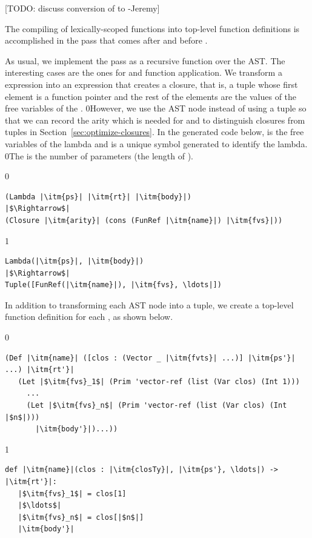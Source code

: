 \documentclass[7x10,nocrop]{TimesAPriori_MIT}%
\def\racketEd{0}
\def\pythonEd{1}
\def\edition{1}
\newcommand{\racket}[1]{{\if\edition\racketEd{#1}\fi}}
\begin{document}
[TODO: discuss conversion of  to  -Jeremy]

The compiling of lexically-scoped functions into top-level function
definitions is accomplished in the pass 
that comes after  and before
. 

As usual, we implement the pass as a recursive function over the
AST. The interesting cases are the ones for  and function
application. We transform a  expression into an expression
that creates a closure, that is, a tuple whose first element is a
function pointer and the rest of the elements are the values of the
free variables of the .
%
\racket{However, we use the 
  AST node instead of using a tuple so that we can record the arity
  which is needed for \code{procedure-arity} and
to distinguish closures from tuples in
Section~\ref{sec:optimize-closures}.}
%
In the generated code below,  is the free variables of the
lambda and  is a unique symbol generated to identify the lambda.
%
\racket{The  is the number of parameters (the length of
  \itm{ps}).}
%
{\if\edition\racketEd
\begin{lstlisting}
(Lambda |\itm{ps}| |\itm{rt}| |\itm{body}|)
|$\Rightarrow$|
(Closure |\itm{arity}| (cons (FunRef |\itm{name}|) |\itm{fvs}|))
\end{lstlisting}
\fi}
%
{\if\edition\pythonEd
\begin{lstlisting}
Lambda(|\itm{ps}|, |\itm{body}|)
|$\Rightarrow$|
Tuple([FunRef(|\itm{name}|), |\itm{fvs}, \ldots|])
\end{lstlisting}
\fi}
%
In addition to transforming each  AST node into a
tuple, we create a top-level function definition for each
, as shown below.\\
\begin{minipage}{0.8\textwidth}
{\if\edition\racketEd
\begin{lstlisting}
(Def |\itm{name}| ([clos : (Vector _ |\itm{fvts}| ...)] |\itm{ps'}| ...) |\itm{rt'}|
   (Let |$\itm{fvs}_1$| (Prim 'vector-ref (list (Var clos) (Int 1)))
     ...
     (Let |$\itm{fvs}_n$| (Prim 'vector-ref (list (Var clos) (Int |$n$|)))
       |\itm{body'}|)...))
\end{lstlisting}
\fi}
{\if\edition\pythonEd
\begin{lstlisting}
def |\itm{name}|(clos : |\itm{closTy}|, |\itm{ps'}, \ldots|) -> |\itm{rt'}|:
   |$\itm{fvs}_1$| = clos[1]
   |$\ldots$|
   |$\itm{fvs}_n$| = clos[|$n$|]
   |\itm{body'}|
\end{lstlisting}
\fi}
\end{minipage}\\
\end{document}
